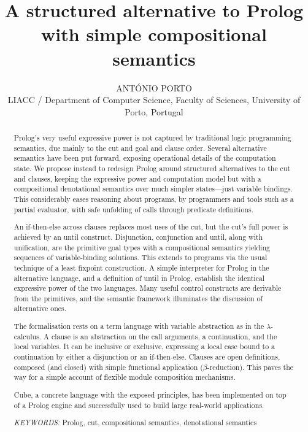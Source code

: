 \documentclass{tlp}
\title{A structured alternative to Prolog with simple compositional semantics}
\author[António Porto]{ANTÓNIO PORTO\\
LIACC / Department of Computer Science, Faculty of Sciences, University of Porto, Portugal\\
\email{ap@dcc.fc.up.pt}}
\newcommand{\cube}{\textsf{Cube}}
\begin{document}
\maketitle

\begin{abstract}
  
  Prolog's very useful expressive power is not captured by traditional logic
  programming semantics, due mainly to the cut and  goal and
  clause order. Several alternative semantics have been put forward,
  exposing operational details of the computation state. We propose
  instead to redesign Prolog around structured alternatives to the cut and
  clauses, keeping the expressive power and computation model but with a
  compositional denotational semantics over much simpler states---just variable
  bindings. This considerably eases reasoning about programs, by programmers
  and tools such as a partial evaluator, with safe unfolding of calls through
  predicate definitions.

  An \textsf{if-then-else}{} across clauses replaces most uses of the cut, but
  the cut's full power is achieved by an \textsf{until} construct. Disjunction,
  conjunction and \textsf{until}, along with unification, are the primitive
  goal types with a compositional semantics yielding
  sequences of variable-binding solutions. This extends to programs
  via the usual technique of a least fixpoint construction. A simple interpreter
  for Prolog in the alternative language, and a definition of
  \textsf{until} in Prolog, establish the identical expressive power of the two
  languages. Many useful control constructs are derivable from the
  primitives, and the semantic framework illuminates the discussion of
  alternative ones.

  The formalisation rests on a term language with
  variable abstraction as in the $\lambda$-calculus. A clause is an abstraction
  on the call arguments, a continuation, and the local
  variables. It can be inclusive or exclusive, expressing a
  local case bound to a continuation by either a disjunction or an
  \textsf{if-then-else}. Clauses are open definitions, composed (and closed)
  with simple functional application ($\beta$-reduction). This paves the way for
  a simple account of flexible module composition mechanisms.

  \cube, a concrete language with the exposed principles, has been implemented on
  top of a Prolog engine and successfully used to build large real-world
  applications.

\vspace{5pt}

\noindent\emph{KEYWORDS:} Prolog, cut, compositional semantics, denotational semantics

\end{abstract}
\end{document}
